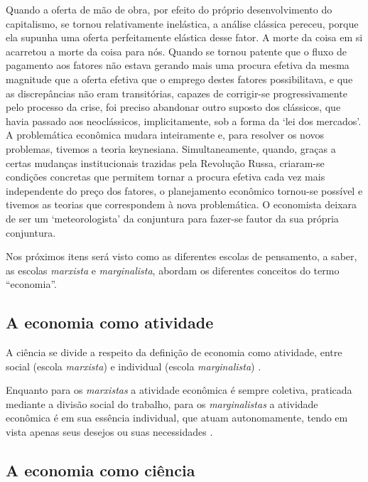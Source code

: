 \documentclass[
	12pt,				%
	oneside,			%
	a4paper,			%
	chapter=TITLE,		%
	section=TITLE,		%
	english,			%
	brazil				%
	]{abntex2}
\begin{document}
\begin{citacao}
Quando a oferta de mão de obra, por efeito do próprio desenvolvimento do 
capitalismo, se tornou relativamente inelástica, a análise clássica pereceu, 
porque ela supunha uma oferta perfeitamente elástica desse fator. A morte da 
coisa em si acarretou a morte da coisa para nós.
Quando se tornou patente que o fluxo de pagamento aos fatores não estava gerando
mais uma procura efetiva da mesma magnitude que a oferta efetiva que o emprego
destes fatores possibilitava, e que as discrepâncias não eram transitórias,
capazes de corrigir-se progressivamente pelo processo da crise, foi preciso 
abandonar outro suposto dos clássicos, que havia passado aos neoclássicos, 
implicitamente, sob a forma da `lei dos mercados'. A problemática econômica
mudara inteiramente e, para resolver os novos problemas, tivemos a teoria
keynesiana.
Simultaneamente, quando, graças a certas mudanças institucionais trazidas pela
Revolução Russa, criaram-se condições concretas que permitem tornar a procura
efetiva cada vez mais independente do preço dos fatores, o planejamento 
econômico tornou-se possível e tivemos as teorias que correspondem à nova
problemática. O economista deixara de ser um `meteorologista' da conjuntura
para fazer-se fautor da sua própria conjuntura.
\cite[p.~206]{rangel1956}
\end{citacao}
Nos próximos itens será visto como as diferentes escolas de pensamento, a saber,
as escolas \emph{marxista} e \emph{marginalista}, abordam os diferentes conceitos do termo
``economia''.

\hypertarget{a-economia-como-atividade}{%
\subsection{A economia como atividade}\label{a-economia-como-atividade}}

A ciência se divide a respeito da definição de economia como atividade, entre
social (escola \emph{marxista}) e individual (escola \emph{marginalista}) \autocite[9]{singer}.

Enquanto para os \emph{marxistas} a atividade econômica é sempre coletiva, praticada
mediante a divisão social do trabalho, para os \emph{marginalistas} a atividade
econômica é em sua essência individual, que atuam autonomamente, tendo em vista
apenas seus desejos ou suas necessidades \autocite[10]{singer}.

\hypertarget{a-economia-como-ciuxeancia}{%
\subsection{A economia como ciência}\label{a-economia-como-ciuxeancia}}
\end{document}
